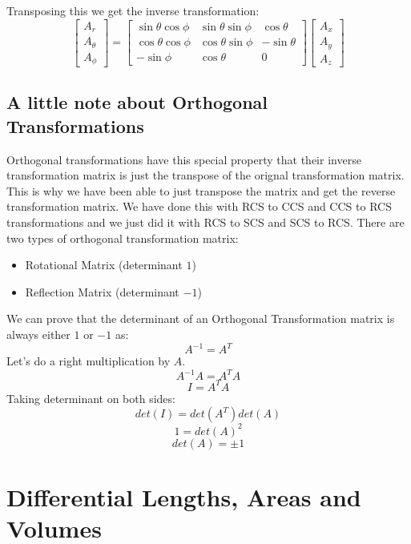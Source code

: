             Transposing this we get the inverse transformation:
            \begin{equation}
                \begin{bmatrix}
                    A_r \\ A_\theta \\ A_\phi    
                \end{bmatrix}
                =
                \begin{bmatrix}
                    \sin\theta\cos\phi & \sin\theta\sin\phi & \cos\theta \\
                    \cos\theta\cos\phi & \cos\theta\sin\phi & -\sin\theta \\
                    -\sin\phi & \cos\theta & 0
                \end{bmatrix}
                \begin{bmatrix}
                    A_x \\ A_y \\ A_z
                \end{bmatrix}
            \end{equation}
        \subsection{A little note about Orthogonal Transformations}
            Orthogonal transformations have this special property that their inverse transformation matrix is just the transpose of the orignal transformation matrix. This is why we have been able to just transpose the matrix and get the reverse transformation matrix. We have done this with RCS to CCS and CCS to RCS transformations and we just did it with RCS to SCS and SCS to RCS. 
            There are two types of orthogonal transformation matrix:
            \begin{itemize}
                \item Rotational Matrix (determinant $1$)
                \item Reflection Matrix (determinant $-1$)
            \end{itemize}
            We can prove that the determinant of an Orthogonal Transformation matrix is always either $1$ or $-1$ as:
            $$A^{-1} = A^T$$
            Let's do a right multiplication by $A$.
            $$A^{-1}A = A^TA$$
            $$I = A^TA$$
            Taking determinant on both sides:
            $$det(I) = det(A^T)det(A)$$
            $$1 = {det(A)}^2$$
            $$det(A) = \pm 1$$
    \section{Differential Lengths, Areas and Volumes}
